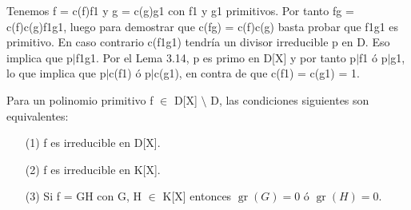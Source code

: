 \begin{proofbox}
Tenemos f = c(f)f1 y g = c(g)g1 con f1 y g1 primitivos. Por tanto fg = c(f)c(g)f1g1, luego para demostrar que c(fg) = c(f)c(g) basta probar que f1g1 es primitivo. En caso contrario c(f1g1) tendría un divisor irreducible p en D. Eso implica que p$|$f1g1. Por el Lema 3.14, p es primo en D[X] y por tanto p$|$f1 ó p$|$g1, lo que implica que p$|$c(f1) ó p$|$c(g1), en contra de que c(f1) = c(g1) = 1.
\end{proofbox}

\begin{proposition}{}{}
Para un polinomio primitivo f $\in$ D[X] $\setminus$ D, las condiciones siguientes son equivalentes:

\begin{enumerate}
\item[(1)] f es irreducible en D[X].
\item[(2)] f es irreducible en K[X].
\item[(3)] Si f = GH con G, H $\in$ K[X] entonces $\operatorname{gr}(G) = 0$ ó $\operatorname{gr}(H) = 0$.
\end{enumerate}
\end{proposition}
